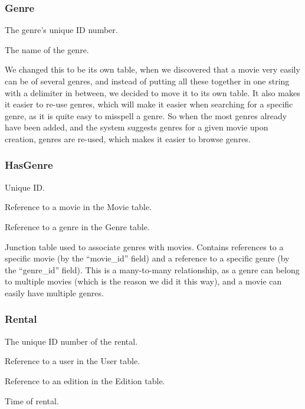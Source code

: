 \subsubsection{Genre}
\label{Design_Database_Tables_Genre}

\begin{my_description}
\item[genre\_id] The genre's unique ID number.
\item[name] The name of the genre.
\end{my_description}

We changed this to be its own table, when we discovered that a movie very easily can be of several genres, and instead of putting all these together in one string with a delimiter in between, we decided to move it to its own table. It also makes it easier to re-use genres, which will make it easier when searching for a specific genre, as it is quite easy to misspell a genre. So when the most genres already have been added, and the system suggests genres for a given movie upon creation, genres are re-used, which makes it easier to browse genres.

\subsubsection{HasGenre}
\label{Design_Database_Tables_HasGenre}

\begin{my_description}
\item[hasgenre\_id] Unique ID.
\item[movie\_id] Reference to a movie in the Movie table.
\item[genre\_id] Reference to a genre in the Genre table.
\end{my_description}

Junction table used to associate genres with movies. Contains references to a specific movie (by the ``movie\_id'' field) and a reference to a specific genre (by the ``genre\_id'' field). This is a many-to-many relationship, as a genre can belong to multiple movies (which is the reason we did it this way), and a movie can easily have multiple genres.

\subsubsection{Rental}
\label{Design_Database_Tables_Rental}

\begin{my_description}
\item[rental\_id] The unique ID number of the rental.
\item[user\_id] Reference to a user in the User table.
\item[edition\_id] Reference to an edition in the Edition table.
\item[time] Time of rental.
\end{my_description}

